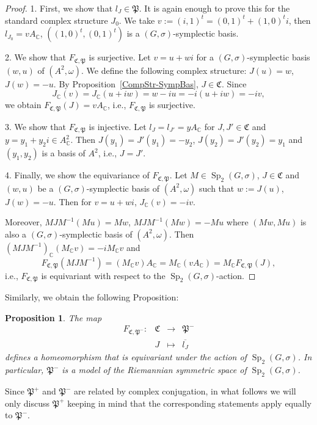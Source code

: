 \documentclass[a4paper,oneside,11pt]{amsart}
\DeclareMathOperator{\Sp}{Sp}
\newcommand{\CC}{\mathbb C}
\theoremstyle{plain}
\newtheorem{prop}[teo]{Proposition}
\theoremstyle{definition}
\theoremstyle{remark}
\begin{document}
\begin{proof}
1. First, we show that $l_J\in\mathfrak P$. It is again enough to prove this for the standard complex structure $J_0$. We take $v:=(i,1)^t=(0,1)^t+(1,0)^ti$, then $l_{J_0}=vA_\CC$, $((1,0)^t,(0,1)^t)$ is a $(G,\sigma)$-symplectic basis.

2. We show that $F_{\mathfrak C,\mathfrak P}$ is surjective. Let $v=u+wi$ for a $(G,\sigma)$-symplectic basis $(w,u)$ of $(A^2,\omega)$. We define the following complex structure: $J(u)=w$, $J(w)=-u$. By Proposition~\ref{CompStr-SympBas}, $J\in\mathfrak C$.
Since
$$J_\CC(v)=J_\CC(u+iw)=w-iu=-i(u+iw)=-iv,$$
we obtain $F_{\mathfrak C,\mathfrak P}(J)=vA_\CC$, i.e., $F_{\mathfrak C,\mathfrak P}$ is surjective.

3. We show that $F_{\mathfrak C,\mathfrak P}$ is injective. Let $l_J=l_{J'}=yA_\CC$ for $J,J'\in\mathfrak C$ and $y=y_1+y_2i\in A^2_\CC$. Then $J(y_1)=J'(y_1)=-y_2$, $J(y_2)=J'(y_2)=y_1$ and $(y_1,y_2)$ is a basis of $A^2$, i.e., $J=J'$.


4. Finally, we show the equivariance of $F_{\mathfrak C,\mathfrak P}$. Let $M\in\Sp_2(G,\sigma)$, $J\in\mathfrak C$ and $(w,u)$ be a $(G,\sigma)$-symplectic basis of $(A^2,\omega)$ such that $w:=J(u)$, $J(w)=-u$. Then for $v=u+wi$, $J_\CC(v)=-iv$.

Moreover, $MJM^{-1}(Mu)=Mw$, $MJM^{-1}(Mw)=-Mu$ where $(Mw, Mu)$ is also a $(G,\sigma)$-symplectic basis of $(A^2,\omega)$. Then $(MJM^{-1})_\CC(M_\CC v)=-iM_\CC v$ and
$$F_{\mathfrak C,\mathfrak P}(MJM^{-1})=(M_\CC v)A_\CC=M_\CC(vA_\CC)=M_\CC F_{\mathfrak C,\mathfrak P}(J),$$
i.e., $F_{\mathfrak C,\mathfrak P}$ is equivariant with respect to the $\Sp_2(G,\sigma)$-action.
\end{proof}

Similarly, we obtain the following Proposition:
\begin{prop}
The map
$$\begin{array}{cccl}
F_{\mathfrak C,\mathfrak P^-}\colon& \mathfrak C& \to & \mathfrak P^-\\
 & J & \mapsto & \overline{l_J}
\end{array}$$
defines a homeomorphism that is equivariant under the action of $\Sp_2(G,\sigma)$. In particular, $\mathfrak P^-$ is a model of the Riemannian symmetric space of $\Sp_2(G,\sigma)$.
\end{prop}

Since $\mathfrak P^+$ and $\mathfrak P^-$ are related by complex conjugation, in what follows we will only discuss $\mathfrak P^+$ keeping in mind that the corresponding statements apply equally to $\mathfrak P^-$.
\end{document}
